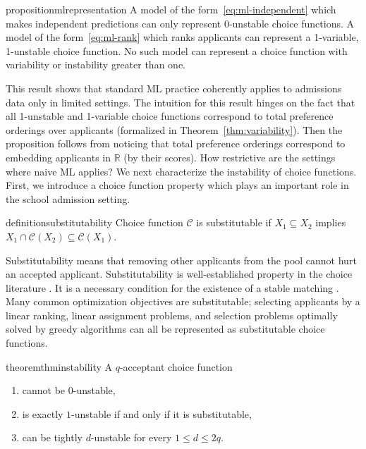 \documentclass[letterpaper]{article}
\newcommand{\choice}{\mathcal{C}}
\begin{document}
\begin{restatable}[ML Representation]{proposition}{mlrepresentation}
\label{prop:ml-representation}
A model of the form~\eqref{eq:ml-independent} which makes independent predictions can only represent 0-unstable choice functions.
A model of the form~\eqref{eq:ml-rank} which ranks applicants can represent a 1-variable, 1-unstable choice function. No such model can represent a choice function with variability or instability greater than one.
\end{restatable}

This result shows that standard ML practice coherently applies to admissions data only in limited settings.
The intuition for this result hinges on the fact that all 1-unstable and 1-variable choice functions correspond to total preference orderings over applicants (formalized in Theorem~\ref{thm:variability}).
Then the proposition follows from noticing that total preference orderings correspond to  embedding applicants in  $\mathbb{R}$  (by their scores).
How restrictive are the settings where naive ML applies? We next characterize the instability of choice functions.
First, we introduce a choice function property which plays an important role in the school admission setting.

\begin{restatable}[Substitutability]{definition}{substitutability}
\label{def:substitutability}
Choice function $\choice$ is substitutable if $X_1 \subseteq X_2$ implies $X_1 \cap \choice(X_2) \subseteq \choice(X_1)$.
\end{restatable}

Substitutability means that removing other applicants from the pool cannot hurt an accepted applicant. Substitutability is well-established property in the choice literature \citep{chernoff1954rational,moulin1985choice,deng2017complexity}. It is a necessary condition for the existence of a stable matching \citep{roth1984stability}. Many common optimization objectives are substitutable; selecting applicants by a linear ranking,  linear assignment problems, and selection problems optimally solved by greedy algorithms \citep{yokoi2019matroidal} can all be represented as substitutable choice functions.

\begin{restatable}{theorem}{thminstability}
\label{thm:instability}
A $q$-acceptant choice function
\begin{enumerate}
    \item cannot be $0$-unstable,
    \item  is exactly $1$-unstable if and only if it is substitutable,
    \item can be tightly $d$-unstable for every $1\leq d \leq 2q$.
\end{enumerate}

\end{restatable}%
\end{document}
